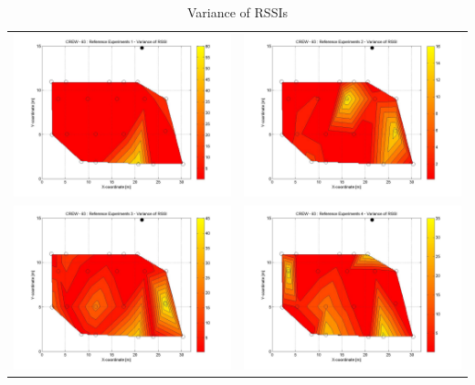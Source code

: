 \documentclass[11pt,a4paper,headinclude,footinclude,chapterprefix=on]{scrreprt}
\begin{document}
\begin{table}
	[h] \centering \caption{Variance of RSSIs} 
	\label{tb:63:Ref:variance} 
	\begin{tabular}
		{|l|l|} \hline 
		\includegraphics[width=8cm]{../../Source/plot/CREW_63/63_Ref_Ex_1_Variance.jpg} & 		\includegraphics[width=8cm]{../../Source/plot/CREW_63/63_Ref_Ex_2_Variance.jpg} \\
		\includegraphics[width=8cm]{../../Source/plot/CREW_63/63_Ref_Ex_3_Variance.jpg} & 		\includegraphics[width=8cm]{../../Source/plot/CREW_63/63_Ref_Ex_4_Variance.jpg} \\
		\hline
	\end{tabular}
\end{table}
\pagebreak 
\end{document}
